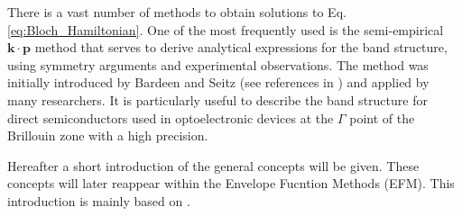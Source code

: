 There is a vast number of methods to obtain solutions to Eq. \ref{eq:Bloch_Hamiltonian}.
One of the most frequently used is the semi-empirical $\mathbf{k}\cdot\mathbf{p}$
method that serves to derive analytical expressions for the band structure,
using symmetry arguments and experimental observations. The method
was initially introduced by Bardeen and Seitz (see references in \citet{Chuang1995})
and applied by many researchers. It is particularly useful to describe
the band structure for direct semiconductors used in optoelectronic
devices at the $\Gamma$ point of the Brillouin zone with a high precision. 

Hereafter a short introduction of the general concepts will be given.
These concepts will later reappear within the Envelope Fucntion Methods
(EFM). This introduction is mainly based on \citet{Yu2005}.

